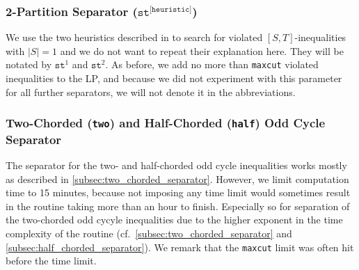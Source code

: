 \subsubsection{2-Partition Separator (\texorpdfstring{$\texttt{st}^{\texttt{[heuristic]}}$}{Δ})}
We use the two heuristics described in \cite{grotschelCuttingPlaneAlgorithm1989} to search for violated $\left[ S,T \right]$-inequalities with $\lvert S \rvert = 1$ and we do not want to repeat their explanation here.
They will be notated by $\texttt{st}^{1}$ and $\texttt{st}^{2}$.
As before, we add no more than \texttt{maxcut} violated inequalities to the LP, and because we did not experiment with this parameter for all further separators, we will not denote it in the abbreviations.

\subsubsection{Two-Chorded (\texttt{two}) and Half-Chorded (\texttt{half}) Odd Cycle Separator}
The separator for the two- and half-chorded odd cycle inequalities works mostly as described in \cref{subsec:two_chorded_separator}.
However, we limit computation time to 15 minutes, because not imposing any time limit would sometimes result in the routine taking more than an hour to finish.
Especially so for separation of the two-chorded odd cycyle inequalities due to the higher exponent in the time complexity of the routine (cf.\ \cref{subsec:two_chorded_separator} and \cref{subsec:half_chorded_separator}).
We remark that the \texttt{maxcut} limit was often hit before the time limit.

